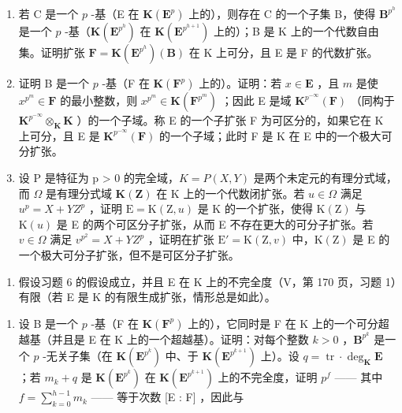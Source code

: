 \begin{enumerate}
\def\labelenumi{\alph{enumi})}
\item
  若 C 是一个 \(p\) -基（E 在 \(\mathbf{K}(\mathbf{E}^p)\) 上的），则存在 C 的一个子集 B，使得 \(\mathbf{B}^{p^h}\) 是一个 \(p\) -基（\(\mathbf{K}(\mathbf{E}^{p^h})\) 在 \(\mathbf{K}(\mathbf{E}^{p^{h+1}})\) 上的）；B 是 K 上的一个代数自由集。证明扩张 \(\mathbf{F} = \mathbf{K}(\mathbf{E}^{p^h})(\mathbf{B})\) 在 K 上可分，且 E 是 F 的代数扩张。
\item
  证明 B 是一个 \(p\) -基（F 在 \(\mathbf{K}(\mathbf{F}^p)\) 上的）。证明：若 \(x \in \mathbf{E}\) ，且 \(m\) 是使 \(x^{p^m} \in \mathbf{F}\) 的最小整数，则 \(x^{p^m} \in \mathbf{K}(\mathbf{F}^{p^m})\) ；因此 E 是域 \(\mathbf{K}^{p^{-\infty}}(\mathbf{F})\) （同构于 \(\mathbf{K}^{p^{-\infty}} \otimes_{\mathbf{K}} \mathbf{K}\) ）的一个子域。称 E 的一个子扩张 F 为可区分的，如果它在 K 上可分，且 E 是 \(\mathbf{K}^{p^{-\infty}}(\mathbf{F})\) 的一个子域；此时 F 是 K 在 E 中的一个极大可分扩张。
\item
  设 P 是特征为 p \textgreater{} 0 的完全域，\(K = P(X, Y)\) 是两个未定元的有理分式域，而 \(\Omega\) 是有理分式域 \(\mathbf{K}(\mathbf{Z})\) 在 K 上的一个代数闭扩张。若 \(u \in \Omega\) 满足 \(u^{p} = X + YZ^{p}\) ，证明 \(\mathrm{E} = \mathrm{K}(\mathrm{Z}, u)\) 是 K 的一个扩张，使得 \(\mathrm{K}(\mathrm{Z})\) 与 \(\mathrm{K}(u)\) 是 E 的两个可区分子扩张，从而 E 不存在更大的可分子扩张。若 \(v \in \Omega\) 满足 \(v^{p^{2}} = X + YZ^{p}\) ，证明在扩张 \(\mathrm{E}' = \mathrm{K}(\mathrm{Z}, v)\) 中，\(\mathrm{K}(\mathrm{Z})\) 是 E 的一个极大可分子扩张，但不是可区分子扩张。
\end{enumerate}

\begin{enumerate}
\def\labelenumi{\arabic{enumi})}
\setcounter{enumi}{6}
\tightlist
\item
  假设习题 6 的假设成立，并且 E 在 K 上的不完全度（V，第 170 页，习题 1）有限（若 E 是 K 的有限生成扩张，情形总是如此）。
\end{enumerate}

\begin{enumerate}
\def\labelenumi{\alph{enumi})}
\tightlist
\item
  设 B 是一个 \(p\) -基（F 在 \(\mathbf{K}(\mathbf{F}^p)\) 上的），它同时是 F 在 K 上的一个可分超越基（并且是 E 在 K 上的一个超越基）。证明：对每个整数 \(k > 0\) ，\(\mathbf{B}^{p^k}\) 是一个 \(p\) -无关子集（在 \(\mathbf{K}(\mathbf{E}^{p^k})\) 中、于 \(\mathbf{K}(\mathbf{E}^{p^{k+1}})\) 上）。设 \(q = \operatorname{tr} \cdot \deg_{\mathbf{K}} \mathbf{E}\) ；若 \(m_k + q\) 是 \(\mathbf{K}(\mathbf{E}^{p^k})\) 在 \(\mathbf{K}(\mathbf{E}^{p^{k+1}})\) 上的不完全度，证明 \(p^f\) —— 其中 \(f = \sum_{k=0}^{h-1} m_k\) —— 等于次数 {[}E : F{]} ，因此与
\end{enumerate}


